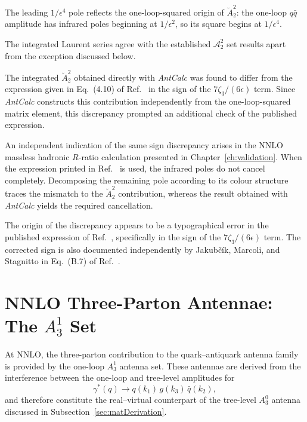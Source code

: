 The leading $1/\epsilon^4$ pole reflects the one-loop-squared origin of $\breve A_2^2$: the one-loop
$q\bar q$ amplitude has infrared poles beginning at $1/\epsilon^2$, so its square begins at $1/\epsilon^4$.

The integrated Laurent series agree with the established $\mathcal A_2^2$ set results
\cite{Gehrmann-DeRidder:2004ttg} apart from the exception discussed below.

The integrated $\breve A_2^2$ obtained directly with \textit{AntCalc} was found to differ from the
expression given in Eq.~(4.10) of Ref.~\cite{Gehrmann-DeRidder:2004ttg} in the sign of the
$7\zeta_3/(6\epsilon)$ term. Since \textit{AntCalc} constructs this contribution independently from the
one-loop-squared matrix element, this discrepancy prompted an additional check of the published
expression.

An independent indication of the same sign discrepancy arises in the NNLO massless hadronic
$R$-ratio calculation presented in Chapter~\ref{ch:validation}. When the expression printed in
Ref.~\cite{Gehrmann-DeRidder:2004ttg} is used, the infrared poles do not cancel completely.
Decomposing the remaining pole according to its colour structure traces the mismatch to the
$\breve A_2^2$ contribution, whereas the result obtained with \textit{AntCalc} yields the required
cancellation.

The origin of the discrepancy appears to be a typographical error in the published expression of
Ref.~\cite{Gehrmann-DeRidder:2004ttg}, specifically in the sign of the $7\zeta_3/(6\epsilon)$ term.
The corrected sign is also documented independently by Jakubčík, Marcoli, and Stagnitto in
Eq.~(B.7) of Ref.~\cite{Jakubcik:2022zdi}.

\section{NNLO Three-Parton Antennae: The $A_3^1$ Set}\label{sec:A31set}

At NNLO, the three-parton contribution to the quark--antiquark antenna family is
provided by the one-loop $A_3^1$ antenna set. These antennae are derived from the
interference between the one-loop and tree-level amplitudes for
\begin{equation*}
    \gamma^*(q)\rightarrow q(k_1)\,g(k_3)\,\bar q(k_2),
\end{equation*}
and therefore constitute the real--virtual counterpart of the tree-level $A_3^0$
antenna discussed in Subsection~\ref{sec:matDerivation}.

